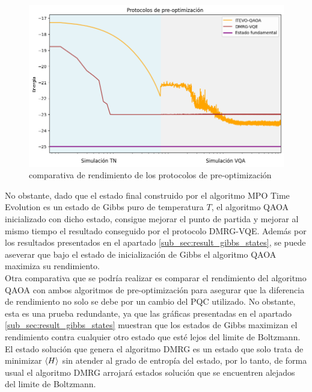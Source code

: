\newpage

\begin{figure}[!h]
    \centering
    \includegraphics[scale = 0.7]{plt/06-comparativa_protocolo.png}
    \caption{comparativa de rendimiento de los protocolos de pre-optimización}
    \label{fig:comparativa_protocolo}
\end{figure}


No obstante, dado que el estado final construido por el algoritmo MPO Time Evolution es un estado de Gibbs puro de temperatura $T$, el algoritmo QAOA inicializado con dicho estado, consigue mejorar el punto de partida y mejorar al mismo tiempo el resultado conseguido por el protocolo DMRG-VQE. Además por los resultados presentados en el apartado \ref{sub_sec:result_gibbs_states}, se puede aseverar que bajo el estado de inicialización de Gibbs el algoritmo QAOA maximiza su rendimiento. \\

Otra comparativa que se podría realizar es comparar el rendimiento del algoritmo QAOA con ambos algoritmos de pre-optimización para asegurar que la diferencia de rendimiento no solo se debe por un cambio del PQC utilizado. No obstante, esta es una prueba redundante, ya que las gráficas presentadas en el apartado \ref{sub_sec:result_gibbs_states} muestran que los estados de Gibbs maximizan el rendimiento contra cualquier otro estado que esté lejos del limite de Boltzmann. El estado solución que genera el algoritmo DMRG es un estado que solo trata de minimizar $\braket{H}$ sin atender al grado de entropía del estado, por lo tanto, de forma usual el algoritmo DMRG arrojará estados solución que se encuentren alejados del limite de Boltzmann.

\newpage

